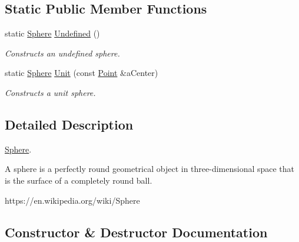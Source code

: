 \subsection*{Static Public Member Functions}
\begin{DoxyCompactItemize}
\item 
static \hyperlink{classlibrary_1_1math_1_1geom_1_1d3_1_1objects_1_1_sphere}{Sphere} \hyperlink{classlibrary_1_1math_1_1geom_1_1d3_1_1objects_1_1_sphere_a777600f8814a2879e925909f30cfe9c4}{Undefined} ()
\begin{DoxyCompactList}\small\item\em Constructs an undefined sphere. \end{DoxyCompactList}\item 
static \hyperlink{classlibrary_1_1math_1_1geom_1_1d3_1_1objects_1_1_sphere}{Sphere} \hyperlink{classlibrary_1_1math_1_1geom_1_1d3_1_1objects_1_1_sphere_a5464ea9145425db63dedbd896d6c97b0}{Unit} (const \hyperlink{classlibrary_1_1math_1_1geom_1_1d3_1_1objects_1_1_point}{Point} \&a\+Center)
\begin{DoxyCompactList}\small\item\em Constructs a unit sphere. \end{DoxyCompactList}\end{DoxyCompactItemize}


\subsection{Detailed Description}
\hyperlink{classlibrary_1_1math_1_1geom_1_1d3_1_1objects_1_1_sphere}{Sphere}. 

A sphere is a perfectly round geometrical object in three-\/dimensional space that is the surface of a completely round ball.

https\+://en.wikipedia.\+org/wiki/\+Sphere 

\subsection{Constructor \& Destructor Documentation}
\mbox{\label{classlibrary_1_1math_1_1geom_1_1d3_1_1objects_1_1_sphere_a55dccc8ea16ee55cd7694c26afa8ea39}} 

